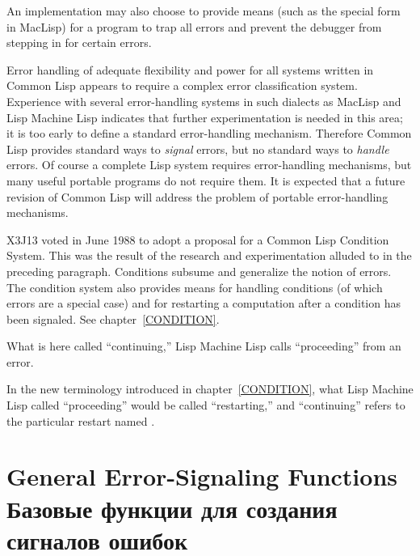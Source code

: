\begin{obsolete}
An implementation may also choose to provide means (such as the
 special form in MacLisp) for a program to trap
all errors and prevent the debugger from stepping in for
certain errors.

\beforenoterule
\begin{rationale}
Error handling of adequate
flexibility and power for all systems written in Common Lisp appears to
require a complex error classification system.
Experience with several error-handling systems
in such dialects as MacLisp and Lisp Machine Lisp indicates that
further experimentation is needed in this area;
it is too early to define a standard error-handling mechanism.
Therefore Common Lisp provides standard ways to \emph{signal} errors,
but no standard ways to \emph{handle} errors.
Of course a
complete Lisp system requires error-handling mechanisms, but many useful
portable programs do not require them.  It is expected that a future
revision of Common Lisp will address the problem of portable error-handling
mechanisms.
\end{rationale}
\afternoterule
\end{obsolete}

\begin{newer}
X3J13 voted in June 1988
to adopt a proposal for a Common Lisp Condition System.
This was the result of the research and experimentation
alluded to in the preceding paragraph.
Conditions subsume and generalize the notion of errors.
The condition system also provides means for handling
conditions (of which errors are a special case) and
for restarting a computation after a condition has been signaled.
See chapter~\ref{CONDITION}.
\end{newer}

\beforenoterule
\begin{incompatibility}
What is here called ``continuing,''
Lisp Machine Lisp calls ``proceeding'' from an error.
\begin{new}
In the new terminology introduced in chapter~\ref{CONDITION},
what Lisp Machine Lisp called ``proceeding'' would be called
``restarting,'' and ``continuing'' refers to the particular
restart named .
\end{new}
\end{incompatibility}
\afternoterule

\section{General Error-Signaling Functions Базовые функции для создания сигналов
ошибок}
\label{ERROR-SIGNALLING-FUNCTIONS}


